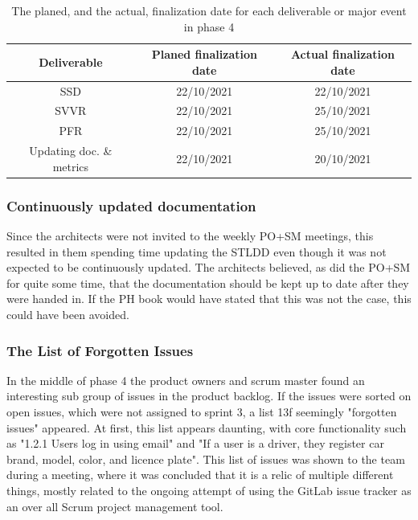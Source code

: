 \documentclass{article}
\begin{document}
\begin{table}[h!]
    \centering
    \begin{tabular}{|c|c|c|}
    \hline
    Deliverable & Planed finalization date & Actual finalization date \\ \hline\hline
    SSD & 22/10/2021 & 22/10/2021 \\ \hline
    SVVR & 22/10/2021 & 25/10/2021 \\ \hline
    PFR & 22/10/2021 & 25/10/2021 \\ \hline
    Updating doc. \& metrics & 22/10/2021 & 20/10/2021 \\ \hline
    \end{tabular}
    \caption{The planed, and the actual, finalization date for each deliverable or major event in phase 4}
    \label{tab:deadlines4}
\end{table}

\subsubsection{Continuously updated documentation}
Since the architects were not invited to the weekly PO+SM meetings, this resulted in them spending time updating the STLDD even though it was not expected to be continuously updated. The architects believed, as did the PO+SM for quite some time, that the documentation should be kept up to date after they were handed in. If the PH book would have stated that this was not the case, this could have been avoided.

\subsubsection{The List of Forgotten Issues} \label{forgotten}
In the middle of phase 4 the product owners and scrum master found an interesting sub group of issues in the product backlog. If the issues were sorted on open issues, which were not assigned to sprint 3, a list 13f seemingly "forgotten issues" appeared. At first, this list appears daunting, with core functionality such as "1.2.1 Users log in using email" and "If a user is a driver, they register car brand, model, color, and licence plate". This list of issues was shown to the team during a meeting, where it was concluded that it is a relic of multiple different things, mostly related to the ongoing attempt of using the GitLab issue tracker as an over all Scrum project management tool.
\end{document}
